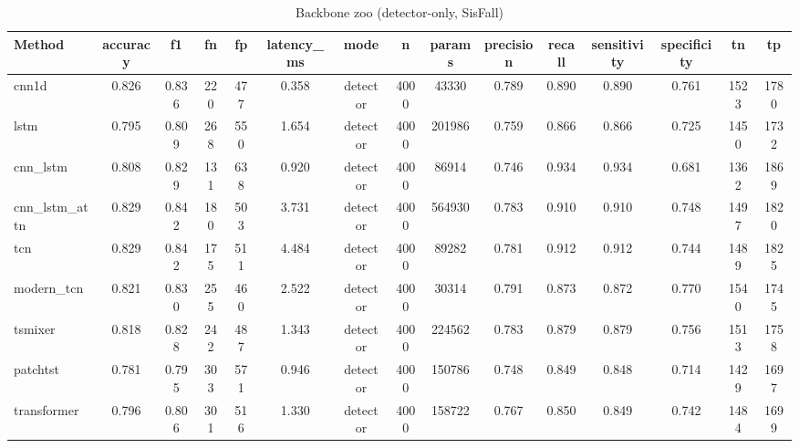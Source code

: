 \begin{table}[t]
\centering
\caption{Backbone zoo (detector-only, SisFall)}
\begin{tabular}{lcccccccccccccc}
\toprule
Method & accuracy & f1 & fn & fp & latency_ms & mode & n & params & precision & recall & sensitivity & specificity & tn & tp \\
\midrule
cnn1d & 0.826 & 0.836 & 220 & 477 & 0.358 & detector & 4000 & 43330 & 0.789 & 0.890 & 0.890 & 0.761 & 1523 & 1780 \\
lstm & 0.795 & 0.809 & 268 & 550 & 1.654 & detector & 4000 & 201986 & 0.759 & 0.866 & 0.866 & 0.725 & 1450 & 1732 \\
cnn_lstm & 0.808 & 0.829 & 131 & 638 & 0.920 & detector & 4000 & 86914 & 0.746 & 0.934 & 0.934 & 0.681 & 1362 & 1869 \\
cnn_lstm_attn & 0.829 & 0.842 & 180 & 503 & 3.731 & detector & 4000 & 564930 & 0.783 & 0.910 & 0.910 & 0.748 & 1497 & 1820 \\
tcn & 0.829 & 0.842 & 175 & 511 & 4.484 & detector & 4000 & 89282 & 0.781 & 0.912 & 0.912 & 0.744 & 1489 & 1825 \\
modern_tcn & 0.821 & 0.830 & 255 & 460 & 2.522 & detector & 4000 & 30314 & 0.791 & 0.873 & 0.872 & 0.770 & 1540 & 1745 \\
tsmixer & 0.818 & 0.828 & 242 & 487 & 1.343 & detector & 4000 & 224562 & 0.783 & 0.879 & 0.879 & 0.756 & 1513 & 1758 \\
patchtst & 0.781 & 0.795 & 303 & 571 & 0.946 & detector & 4000 & 150786 & 0.748 & 0.849 & 0.848 & 0.714 & 1429 & 1697 \\
transformer & 0.796 & 0.806 & 301 & 516 & 1.330 & detector & 4000 & 158722 & 0.767 & 0.850 & 0.849 & 0.742 & 1484 & 1699 \\
\bottomrule
\end{tabular}
\end{table}